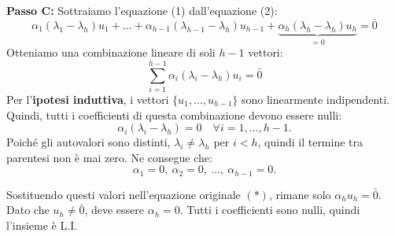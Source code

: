 {{\begin{itemize}
            \textbf{Passo C:} Sottraiamo l'equazione (1) dall'equazione (2):
            \[
            \alpha_1 (\lambda_1 - \lambda_h) u_1 + \dots + \alpha_{h-1} (\lambda_{h-1} - \lambda_h) u_{h-1} + \underbrace{\alpha_h (\lambda_h - \lambda_h) u_h}_{=0} = \bar{0}
            \]
            Otteniamo una combinazione lineare di soli \(h-1\) vettori:
            \[
            \sum_{i=1}^{h-1} \alpha_i (\lambda_i - \lambda_h) u_i = \bar{0}
            \]
            Per l'\textbf{ipotesi induttiva}, i vettori \(\{u_1, \dots, u_{h-1}\}\) sono linearmente indipendenti. Quindi, tutti i coefficienti di questa combinazione devono essere nulli:
            \[
            \alpha_i (\lambda_i - \lambda_h) = 0 \quad \forall i = 1, \dots, h-1.
            \]
            Poiché gli autovalori sono distinti, \(\lambda_i \neq \lambda_h\) per \(i < h\), quindi il termine tra parentesi non è mai zero. Ne consegue che:
            \[
            \alpha_1 = 0, \ \alpha_2 = 0, \ \dots, \ \alpha_{h-1} = 0.
            \]
            
            Sostituendo questi valori nell'equazione originale \((*)\), rimane solo \(\alpha_h u_h = \bar{0}\). Dato che \(u_h \neq \bar{0}\), deve essere \(\alpha_h = 0\).
            Tutti i coefficienti sono nulli, quindi l'insieme è L.I.
        \end{itemize}
    }
}

